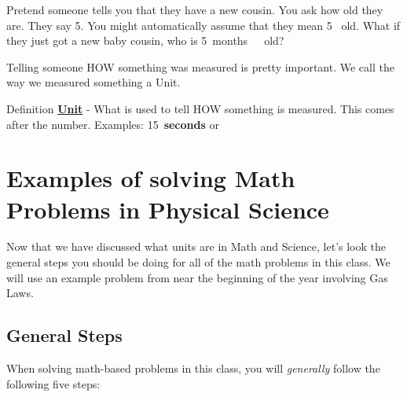 \documentclass[../../main.tex]{subfiles}
\begin{document}
Pretend someone tells you that they have a new cousin.  You ask how old they are.  They say 5.  You might automatically assume that they mean \num{5}~\unit{\years} old.  What if they just got a new baby cousin, who is \qty{5}{months\ old}?

Telling someone HOW something was measured is pretty important.  We call the way we measured something a Unit.

\begin{displayquote}
	\begin{boxBox}{Definition}
		{\large\textbf{\underline{Unit}}} - What is used to tell HOW something is measured.  This comes after the number. Examples: \qty{15}{\textbf{seconds}} or
	\end{boxBox}
\end{displayquote}

\section{Examples of solving Math Problems in Physical Science}

Now that we have discussed what units are in Math and Science, let's look the general steps you should be doing for all of the math problems in this class.  We will use an example problem from near the beginning of the year involving Gas Laws.


\subsection{General Steps}
When solving math-based problems in this class, you will \emph{generally} follow the following five steps:
\end{document}
